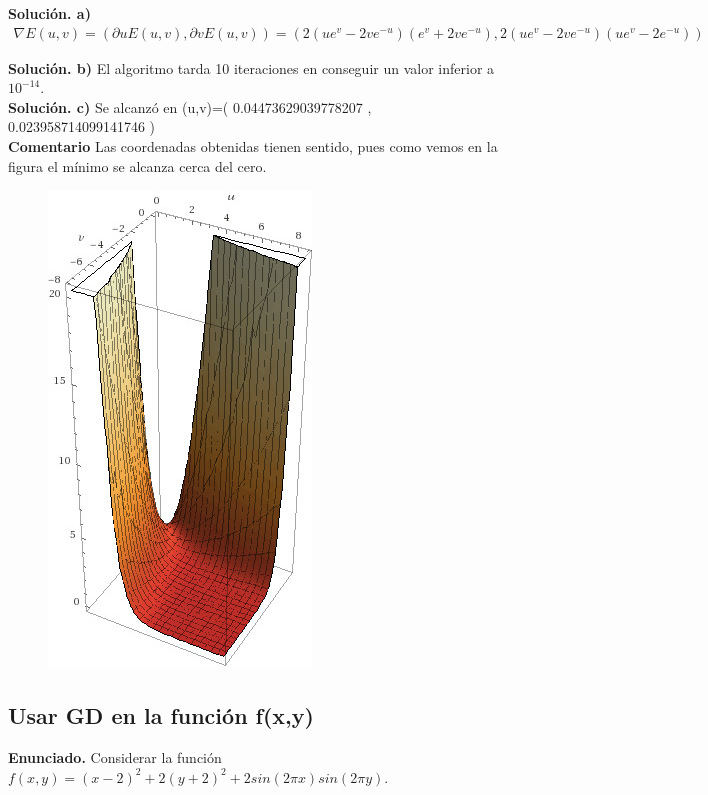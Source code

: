 \documentclass[a4paper,11pt]{article}
\begin{document}
\textbf{Solución. a)}
\begin{align*}
\nabla E(u,v)=(\partial u E(u,v),\partial v E(u,v) )= (2(ue^{v}-2ve^{-u})(e^{v}+2ve^{-u}),2(ue^{v}-2ve^{-u})(ue^{v}-2e^{-u}) )
\end{align*}

\textbf{Solución. b)} El algoritmo tarda 10 iteraciones en conseguir un valor inferior a $10^{-14}$.\\

\textbf{Solución. c)} Se alcanzó en (u,v)=( 0.04473629039778207 ,  0.023958714099141746 )\\

\textbf{Comentario} Las coordenadas obtenidas tienen sentido, pues como vemos en la figura el mínimo se alcanza cerca del cero.

\begin{figure}[h]
\includegraphics[scale=0.5]{Ejercicio1.1}
\centering
\end{figure}


\subsection{Usar GD en la función f(x,y)}
\textbf{Enunciado.} Considerar la función $f(x,y)= (x-2)^{2}+2(y+2)^{2}+2sin(2\pi x)sin(2\pi y)$.
\end{document}
